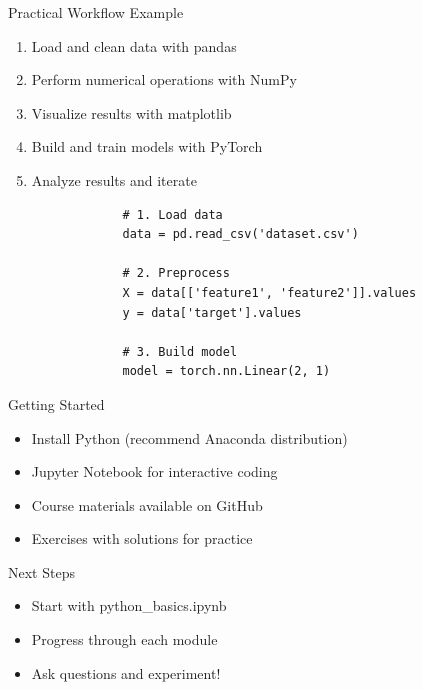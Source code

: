 \documentclass{beamer}
\begin{document}
	\begin{frame}{Practical Workflow Example}
		\begin{enumerate}
			\item Load and clean data with pandas
			\item Perform numerical operations with NumPy
			\item Visualize results with matplotlib
			\item Build and train models with PyTorch
			\item Analyze results and iterate
		\end{enumerate}
		
		\begin{example}[AI workflow]
			\begin{lstlisting}
				# 1. Load data
				data = pd.read_csv('dataset.csv')
				
				# 2. Preprocess
				X = data[['feature1', 'feature2']].values
				y = data['target'].values
				
				# 3. Build model
				model = torch.nn.Linear(2, 1)
			\end{lstlisting}
		\end{example}
	\end{frame}
	
	\begin{frame}{Getting Started}
		\begin{itemize}
			\item Install Python (recommend Anaconda distribution)
			\item Jupyter Notebook for interactive coding
			\item Course materials available on GitHub
			\item Exercises with solutions for practice
		\end{itemize}
		
		\begin{block}{Next Steps}
			\begin{itemize}
				\item Start with python\_basics.ipynb
				\item Progress through each module
				\item Ask questions and experiment!
			\end{itemize}
		\end{block}
	\end{frame}
	
\end{document}
